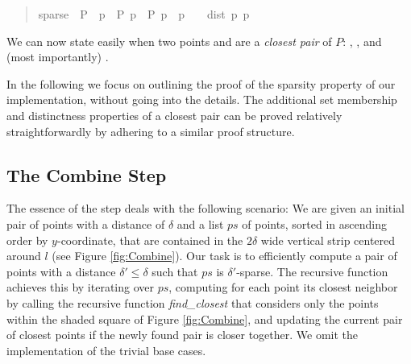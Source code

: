 \begin{isabellebody}
\begin{isamarkuptext}
\begin{quote}
%
\begin{isabelle}%
sparse\ {\isasymdelta}\ P\ {\isacharequal}\ {\isacharparenleft}{\isasymforall}p\ {\isasymin}\ P{\isachardot}\ {\isasymforall}p\ {\isasymin}\ P{\isachardot}\ p\ {\isasymnoteq}\ p\ {\isasymlongrightarrow}\ {\isasymdelta}\ {\isasymle}\ dist\ p\ p%
\end{isabelle}
\end{quote}
We can now state easily when two points  and  are a \textit{closest pair} of $P$: \mbox{}, , 
and (most importantly) .

In the following we focus on outlining the proof of the sparsity property of our implementation,
without going into the details. The additional
set membership and distinctness properties of a closest pair can be proved relatively straightforwardly
by adhering to a similar proof structure.

\subsection{The Combine Step}

The essence of the  step deals with the following scenario: We are given an initial pair of points
with a distance of $\delta$ and a list $\mathit{ps}$ of points, sorted in ascending order by $y$-coordinate,
that are contained in the $2\delta$ wide vertical strip centered around $l$ (see Figure \ref{fig:Combine}). Our task is to
efficiently compute a pair of points with a distance $\delta' \le \delta$ such that $\mathit{ps}$ is $\delta'$-sparse.
The recursive function  achieves this by iterating over $\mathit{ps}$, computing
for each point its closest neighbor by calling the recursive function \textit{find\_closest} that
considers only the points within the shaded square of Figure \ref{fig:Combine}, and updating the
current pair of closest points if the newly found pair is closer together. We omit the implementation of the trivial base cases.


\end{isamarkuptext}
\end{isabellebody}
